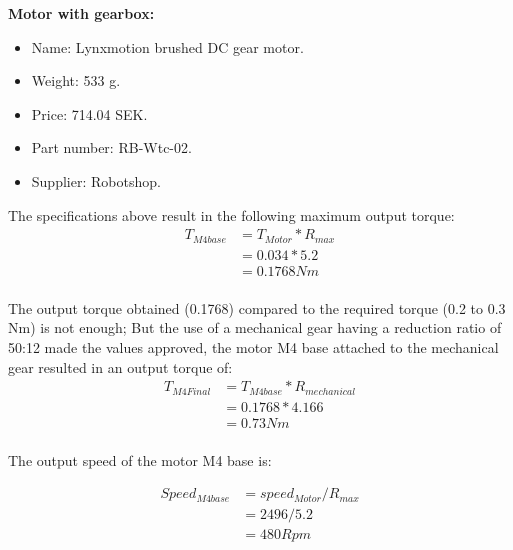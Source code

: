 \begin{enumerate}
\begin{itemize}
    \textbf{Motor with gearbox:}
    \begin{itemize}
        \item Name: Lynxmotion brushed DC gear motor.
        \item Weight: 533 g.
        \item Price: 714.04 SEK.
        \item Part number: RB-Wtc-02.
        \item Supplier: Robotshop.\\
    \end{itemize}
    
    The specifications above result in the following maximum output torque:
    \begin{equation} \label{eq: T_M4base}
    \begin{split}
    T_{M4base} & = T_{Motor} * R_{max}\\
    & =  0.034 * 5.2\\
    & = 0.1768 Nm\\
    \end{split}
    \end{equation}
    
    The output torque obtained (0.1768) compared to the required torque (0.2 to 0.3 Nm) is not enough; But the use of a mechanical gear having a reduction ratio of 50:12 made the values approved, the motor M4 base attached to the mechanical gear resulted in an output torque of:
    \begin{equation} \label{eq: T_M4Final}
    \begin{split} 
    T_{M4Final} & = T_{M4base} * R_{mechanical}\\
    & =  0.1768 * 4.166\\
    & = 0.73 Nm\\
    \end{split}
    \end{equation}
    
    
    The output speed of the motor M4 base is:
    
    \begin{equation} \label{eq: Speed_M4base}
    \begin{split}
    Speed_{M4base} & = speed_{Motor} / R_{max}\\
    & =  2496 / 5.2\\
    & = 480 Rpm\\
    \end{split}
    \end{equation}
    

\end{itemize}
\end{enumerate}
